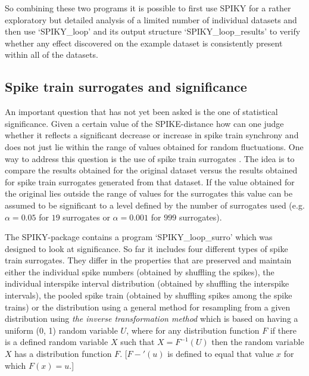 \documentclass[10pt,twocolumn]{elsart5p}
\begin{document}
So combining these two programs it is possible to first use SPIKY for a rather exploratory but detailed analysis of a limited number of individual datasets and then use `SPIKY\_loop' and its output structure `SPIKY\_loop\_results' to verify whether any effect discovered on the example dataset is consistently present within all of the datasets.


\subsection{\label{ss:Spike-train-surrogates} Spike train surrogates and significance}

An important question that has not yet been asked is the one of statistical significance. Given a certain value of the SPIKE-distance how can one judge whether it reflects a significant decrease or increase in spike train synchrony and does not just lie within the range of values obtained for random fluctuations. One way to address this question is the use of spike train surrogates \citep{Kass05, Gruen09, Louis10}. The idea is to compare the results obtained for the original dataset versus the results obtained for spike train surrogates generated from that dataset. If the value obtained for the original lies outside the range of values for the surrogates this value can be assumed to be significant to a level defined by the number of surrogates used (e.g. $\alpha = 0.05$ for $19$ surrogates or $\alpha = 0.001$ for $999$ surrogates).

The SPIKY-package contains a program `SPIKY\_loop\_surro' which was designed to look at significance.
So far it includes four different types of spike train surrogates. They differ in the properties that are preserved and maintain either the individual spike numbers (obtained by shuffling the spikes), the individual interspike interval distribution (obtained by shuffling the interspike intervals), the pooled spike train (obtained by shuffling spikes among the spike trains) or the distribution using a general method for resampling from a given distribution using {\it the inverse transformation method} which is based on having a uniform (0, 1) random variable $U$, where for any distribution function $F$ if there is a defined random variable $X$ such that $X = F^{-1}(U)$ then the random variable $X$ has a distribution function $F$. [$F-'(u)$ is defined to equal that value $x$ for which $F(x) = u.$]

%
\end{document}
